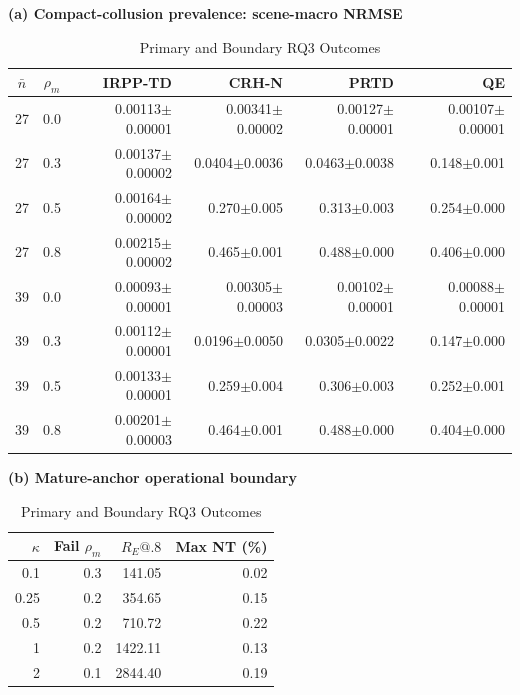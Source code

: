 \documentclass[journal]{IEEEtran}
\begin{document}
\begin{table}[!t]
\centering
\caption{Primary and Boundary RQ3 Outcomes}
\label{tab:rq3-complete}
\scriptsize
\textbf{(a) Compact-collusion prevalence: scene-macro NRMSE}\par\vspace{0.35ex}
\setlength{\tabcolsep}{4.0pt}
\begin{tabular}{ccrrrr}
\toprule
$\bar n$ & $\rho_m$ & IRPP-TD & CRH-N & PRTD & QE \\
\midrule
27 & 0.0 & 0.00113$\pm$0.00001 & 0.00341$\pm$0.00002 & 0.00127$\pm$0.00001 & 0.00107$\pm$0.00001 \\
27 & 0.3 & 0.00137$\pm$0.00002 & 0.0404$\pm$0.0036 & 0.0463$\pm$0.0038 & 0.148$\pm$0.001 \\
27 & 0.5 & 0.00164$\pm$0.00002 & 0.270$\pm$0.005 & 0.313$\pm$0.003 & 0.254$\pm$0.000 \\
27 & 0.8 & 0.00215$\pm$0.00002 & 0.465$\pm$0.001 & 0.488$\pm$0.000 & 0.406$\pm$0.000 \\
\midrule
39 & 0.0 & 0.00093$\pm$0.00001 & 0.00305$\pm$0.00003 & 0.00102$\pm$0.00001 & 0.00088$\pm$0.00001 \\
39 & 0.3 & 0.00112$\pm$0.00001 & 0.0196$\pm$0.0050 & 0.0305$\pm$0.0022 & 0.147$\pm$0.000 \\
39 & 0.5 & 0.00133$\pm$0.00001 & 0.259$\pm$0.004 & 0.306$\pm$0.003 & 0.252$\pm$0.001 \\
39 & 0.8 & 0.00201$\pm$0.00003 & 0.464$\pm$0.001 & 0.488$\pm$0.000 & 0.404$\pm$0.000 \\
\bottomrule
\end{tabular}
\par\vspace{1.1ex}
\begin{minipage}[t]{0.31\textwidth}
\centering\textbf{(b) Mature-anchor operational boundary}\par\vspace{0.35ex}
\setlength{\tabcolsep}{3.2pt}\begin{tabular}{rrrr}
\toprule $\kappa$ & Fail $\rho_m$ & $R_E@.8$ & Max NT (\%) \\
\midrule 0.1&0.3&141.05&0.02\\ 0.25&0.2&354.65&0.15\\ 0.5&0.2&710.72&0.22\\ 1&0.2&1422.11&0.13\\ 2&0.1&2844.40&0.19\\
\bottomrule\end{tabular}
\end{minipage}\hfill

\end{table}
\end{document}
